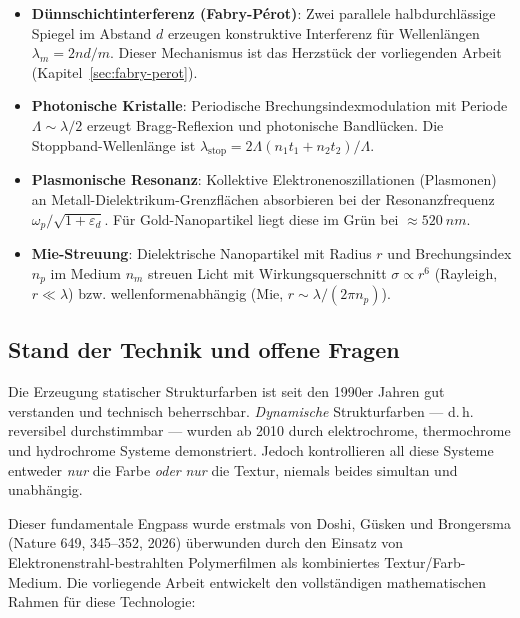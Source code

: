﻿\documentclass[a4paper,12pt]{article}
\theoremstyle{definition}
\begin{document}
	\begin{itemize}[leftmargin=*]
		\item \textbf{Dünnschichtinterferenz (Fabry-Pérot)}: Zwei parallele
		halbdurchlässige Spiegel im Abstand $d$ erzeugen konstruktive Interferenz
		für Wellenlängen $\lambda_m = 2nd/m$. Dieser Mechanismus ist das
		Herzstück der vorliegenden Arbeit (Kapitel~\ref{sec:fabry-perot}).
		
		\item \textbf{Photonische Kristalle}: Periodische Brechungsindexmodulation
		mit Periode $\Lambda \sim \lambda/2$ erzeugt Bragg-Reflexion und
		photonische Bandlücken. Die Stoppband-Wellenlänge ist
		$\lambda_\mathrm{stop} = 2\Lambda(n_1 t_1 + n_2 t_2)/\Lambda$.
		
		\item \textbf{Plasmonische Resonanz}: Kollektive Elektronenoszillationen
		(Plasmonen) an Metall-Dielektrikum-Grenzflächen absorbieren bei der
		Resonanzfrequenz $\omega_p/\sqrt{1 + \varepsilon_d}$.
		Für Gold-Nanopartikel liegt diese im Grün bei $\approx \SI{520}{nm}$.
		
		\item \textbf{Mie-Streuung}: Dielektrische Nanopartikel mit Radius $r$ und
		Brechungsindex $n_p$ im Medium $n_m$ streuen Licht mit
		Wirkungsquerschnitt $\sigma \propto r^6$ (Rayleigh, $r \ll \lambda$)
		bzw. wellenformenabhängig (Mie, $r \sim \lambda/(2\pi n_p)$).
	\end{itemize}
	
	\subsection{Stand der Technik und offene Fragen}
	\label{ssec:stand}
	
	Die Erzeugung statischer Strukturfarben ist seit den 1990er Jahren gut
	verstanden und technisch beherrschbar. \emph{Dynamische} Strukturfarben ---
	d.\,h. reversibel durchstimmbar --- wurden ab 2010 durch elektrochrome,
	thermochrome und hydrochrome Systeme demonstriert. Jedoch kontrollieren all
	diese Systeme entweder \emph{nur} die Farbe \emph{oder} \emph{nur} die Textur,
	niemals beides simultan und unabhängig.
	
	Dieser fundamentale Engpass wurde erstmals von Doshi, Güsken und Brongersma
	(Nature 649, 345--352, 2026) überwunden durch den Einsatz von
	Elektronenstrahl-bestrahlten Polymerfilmen als kombiniertes Textur/Farb-Medium.
	Die vorliegende Arbeit entwickelt den vollständigen mathematischen Rahmen für
	diese Technologie:
	
\end{document}
